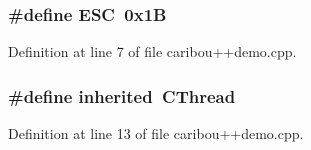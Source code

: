 \subsubsection[{E\-S\-C}]{\setlength{\rightskip}{0pt plus 5cm}\#define E\-S\-C~0x1\-B}\label{caribou_09_09demo_8cpp_a4af1b6159e447ba72652bb7fcdfa726e}


Definition at line 7 of file caribou++demo.\-cpp.

\subsubsection[{inherited}]{\setlength{\rightskip}{0pt plus 5cm}\#define inherited~C\-Thread}\label{caribou_09_09demo_8cpp_a3920e3b7cb0909b941b2409493acf8f1}


Definition at line 13 of file caribou++demo.\-cpp.


